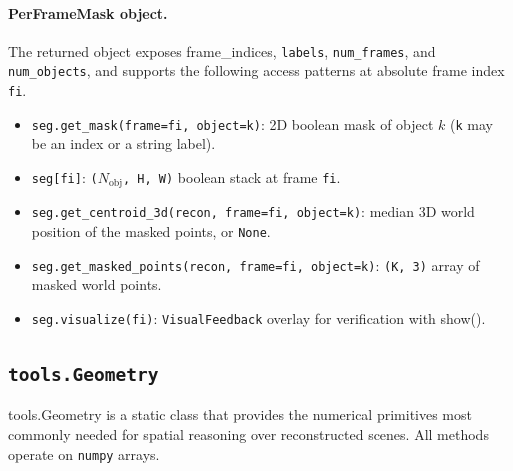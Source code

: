 \documentclass{llmxive}
\providecommand{\apicode}[1]{#1}
\begin{document}
\paragraph{PerFrameMask object.} The returned object exposes \apicode{frame_indices}, \texttt{labels}, \texttt{num\_frames}, and \texttt{num\_objects}, and supports the following access patterns at absolute frame index \texttt{fi}.
\begin{itemize}[leftmargin=1.5em]
\item \texttt{seg.get\_mask(frame=fi, object=k)}: 2D boolean mask of object $k$ (\texttt{k} may be an index or a string label).
\item \texttt{seg[fi]}: \texttt{($N_{\text{obj}}$, H, W)} boolean stack at frame \texttt{fi}.
\item \texttt{seg.get\_centroid\_3d(recon, frame=fi, object=k)}: median 3D world position of the masked points, or \texttt{None}.
\item \texttt{seg.get\_masked\_points(recon, frame=fi, object=k)}: \texttt{(K, 3)} array of masked world points.
\item \texttt{seg.visualize(fi)}: \texttt{VisualFeedback} overlay for verification with \apicode{show()}.
\end{itemize}

\subsection{\texttt{tools.Geometry}}
\label{app:tool_geometry}
\apicode{tools.Geometry} is a static class that provides the numerical primitives most commonly needed for spatial reasoning over reconstructed scenes. All methods operate on \texttt{numpy} arrays.
\end{document}
